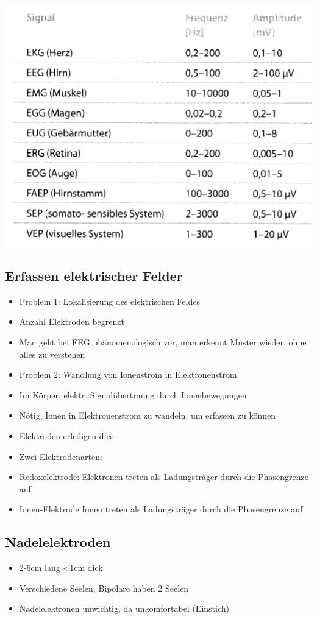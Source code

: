 \documentclass[a4paper,10pt,oneside]{article}
\begin{document}
\includegraphics[scale=0.65]{Grafiken/bioelektrischesignalefreq.png}

\subsection{Erfassen elektrischer Felder}
\begin{itemize}
	\item Problem 1: Lokalisierung des elektrischen Feldes
	\item Anzahl Elektroden begrenzt
	\item Man geht bei EEG phänomenologisch vor, man erkennt Muster wieder, ohne alles zu verstehen
	\item Problem 2: Wandlung von Ionenstrom in Elektronenstrom
	\item Im Körper: elektr. Signalübertraung durch Ionenbewegungen
	\item Nötig, Ionen in Elektronenstrom zu wandeln, um erfassen zu können
	\item Elektroden erledigen dies
	\item Zwei Elektrodenarten:
	\item Redoxelektrode: Elektronen treten als Ladungsträger durch die Phasengrenze auf
	\item Ionen-Elektrode Ionen treten als Ladungsträger durch die Phasengrenze auf
\end{itemize}


\subsection{Nadelelektroden}
\begin{itemize}
	\item 2-6cm lang <1cm dick
	\item Verschiedene Seelen, Bipolare haben 2 Seelen
	\item Nadelelektronen unwichtig, da unkomfortabel (Einstich)
\end{itemize}
\end{document}
